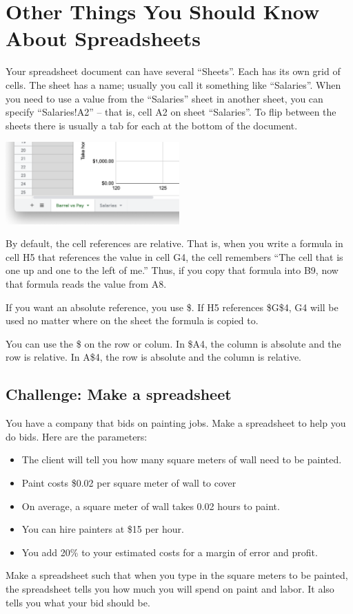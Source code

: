 \section{Other Things You Should Know About Spreadsheets}

Your spreadsheet document can have several ``Sheets''.  Each has its
own grid of cells.  The sheet has a name; usually you call it
something like ``Salaries''.  When you need to use a value from the
``Salaries'' sheet in another sheet, you can specify ``Salaries!A2''
-- that is, cell A2 on sheet ``Salaries''.  To flip between the sheets
there is usually a tab for each at the bottom of the document.

\includegraphics[width=0.5\textwidth]{Sheets.png}

By default, the cell references are relative.  That is, when you write
a formula in cell H5 that references the value in cell G4, the cell
remembers ``The cell that is one up and one to the left of me.''
Thus, if you copy that formula into B9, now that formula reads the
value from A8.

If you want an absolute reference, you use \$.  If H5 references
\$G\$4, G4 will be used no matter where on the sheet the formula is
copied to.

You can use the \$ on the row or colum.  In \$A4, the column is
absolute and the row is relative.  In A\$4, the row is absolute and
the column is relative.

\subsection{Challenge: Make a spreadsheet}

You have a company that bids on painting jobs. Make a
spreadsheet to help you do bids. Here are the parameters:
\begin{itemize}
\item The client will tell you how many square meters of wall need to be painted.
\item Paint costs \$0.02 per square meter of wall to cover
\item On average, a square meter of wall takes 0.02 hours to paint.
\item You can hire painters at \$15 per hour.
\item You add 20\% to your estimated costs for a margin of error and profit.
\end{itemize}

Make a spreadsheet such that when you type in the square meters to be
painted, the spreadsheet tells you how much you will spend on paint
and labor.  It also tells you what your bid should be.
